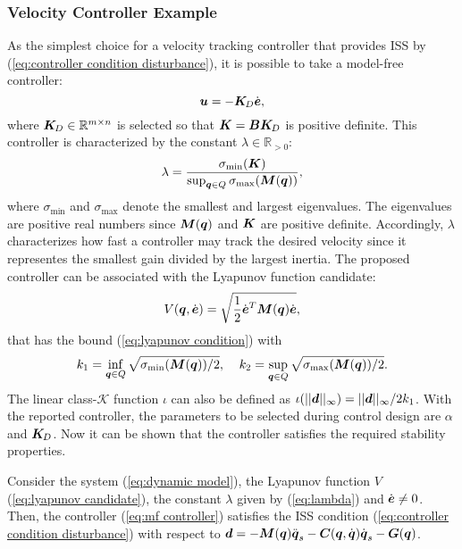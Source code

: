 \subsubsection{Velocity Controller Example}
As the simplest choice for a velocity tracking controller that provides ISS by (\ref{eq:controller condition disturbance}), it is possible to take a model-free controller:
\begin{equation} \label{eq:mf controller}
    \boldsymbol{u} = -\boldsymbol{K}_{\!D} \dot{\boldsymbol{e}},
\end{equation}
where $\boldsymbol{K}_{\!D} \in \mathbb{R}^{m \times n}$ is selected so that $\boldsymbol{K}=\boldsymbol{B} \boldsymbol{K}_{\!D}$ is positive definite. This controller is characterized by the constant $\lambda \in \mathbb{R}_{>0}$:
\begin{equation} \label{eq:lambda}
    \lambda = \frac{\sigma_{\min}(\boldsymbol{K})}{\sup_{{\boldsymbol{q}} \in Q} \sigma_{\max}(\boldsymbol{M}({\boldsymbol{q}}))},
\end{equation}
where $\sigma_{\min}$ and $\sigma_{\max}$ denote the smallest and largest eigenvalues. The eigenvalues are positive real numbers since $\boldsymbol{M}({\boldsymbol{q}})$ and $\boldsymbol{K}$ are positive definite. Accordingly, $\lambda$ characterizes how fast a controller may track the desired velocity since it representes the smallest gain divided by the largest inertia. The proposed controller can be associated with the Lyapunov function candidate:
\begin{equation} \label{eq:lyapunov candidate}
    V({\boldsymbol{q}},\dot{\boldsymbol{e}}) = \sqrt{\frac{1}{2} \dot{\boldsymbol{e}}^T \boldsymbol{M}({\boldsymbol{q}}) \dot{\boldsymbol{e}}},
\end{equation}
that has the bound (\ref{eq:lyapunov condition}) with 
\begin{equation} 
    k_1= \inf_{{\boldsymbol{q}} \in Q} \sqrt{\sigma_{\min} (\boldsymbol{M}({\boldsymbol{q}}))/2}, \;\;\;\; k_2= \sup_{{\boldsymbol{q}} \in Q} \sqrt{\sigma_{\max} (\boldsymbol{M}({\boldsymbol{q}}))/2}.
\end{equation}
The linear class-$\mathcal{K}$ function $\iota$ can also be defined as $\iota(||\boldsymbol{d}||_\infty)=||\boldsymbol{d}||_\infty/{2k_1}$. With the reported controller, the parameters to be selected during control design are $\alpha$ and $\boldsymbol{K}_{\!D}$. Now it can be shown that the controller satisfies the required stability properties.
\begin{theorem}
    Consider the system (\ref{eq:dynamic model}), the Lyapunov function $V$ (\ref{eq:lyapunov candidate}), the constant $\lambda$ given by (\ref{eq:lambda}) and $\dot{\boldsymbol{e}} \neq 0$. Then, the controller (\ref{eq:mf controller}) satisfies the ISS condition (\ref{eq:controller condition disturbance}) with respect to $\boldsymbol{d} = -\boldsymbol{M}({\boldsymbol{q}})\ddot{{\boldsymbol{q}}}_s-\boldsymbol{C}({\boldsymbol{q}},\dot{{\boldsymbol{q}}})\dot{{\boldsymbol{q}}}_s-\boldsymbol{G}({\boldsymbol{q}})$.
\end{theorem}
